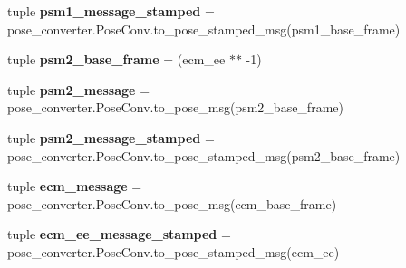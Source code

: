 \begin{DoxyCompactItemize}
\item 
\hypertarget{classmtm__alignment__test_1_1mtm__aligner_a5ab5797fdbfebd015d215d9dbcb2929e}{tuple {\bfseries psm1\-\_\-message\-\_\-stamped} = pose\-\_\-converter.\-Pose\-Conv.\-to\-\_\-pose\-\_\-stamped\-\_\-msg(psm1\-\_\-base\-\_\-frame)}\label{classmtm__alignment__test_1_1mtm__aligner_a5ab5797fdbfebd015d215d9dbcb2929e}

\item 
\hypertarget{classmtm__alignment__test_1_1mtm__aligner_a3575f94b228b6d8998bb4c19f8f4cde9}{tuple {\bfseries psm2\-\_\-base\-\_\-frame} = (ecm\-\_\-ee $\ast$$\ast$ -\/1)}\label{classmtm__alignment__test_1_1mtm__aligner_a3575f94b228b6d8998bb4c19f8f4cde9}

\item 
\hypertarget{classmtm__alignment__test_1_1mtm__aligner_a08c8a821a4f07982873341c23fe4a09d}{tuple {\bfseries psm2\-\_\-message} = pose\-\_\-converter.\-Pose\-Conv.\-to\-\_\-pose\-\_\-msg(psm2\-\_\-base\-\_\-frame)}\label{classmtm__alignment__test_1_1mtm__aligner_a08c8a821a4f07982873341c23fe4a09d}

\item 
\hypertarget{classmtm__alignment__test_1_1mtm__aligner_a8c0374e589d2db89fd59e01dbfaef02f}{tuple {\bfseries psm2\-\_\-message\-\_\-stamped} = pose\-\_\-converter.\-Pose\-Conv.\-to\-\_\-pose\-\_\-stamped\-\_\-msg(psm2\-\_\-base\-\_\-frame)}\label{classmtm__alignment__test_1_1mtm__aligner_a8c0374e589d2db89fd59e01dbfaef02f}

\item 
\hypertarget{classmtm__alignment__test_1_1mtm__aligner_affd419c85a6756e4646051d811ac38ba}{tuple {\bfseries ecm\-\_\-message} = pose\-\_\-converter.\-Pose\-Conv.\-to\-\_\-pose\-\_\-msg(ecm\-\_\-base\-\_\-frame)}\label{classmtm__alignment__test_1_1mtm__aligner_affd419c85a6756e4646051d811ac38ba}

\item 
\hypertarget{classmtm__alignment__test_1_1mtm__aligner_add6c43296672eb784ced99b9e224f58e}{tuple {\bfseries ecm\-\_\-ee\-\_\-message\-\_\-stamped} = pose\-\_\-converter.\-Pose\-Conv.\-to\-\_\-pose\-\_\-stamped\-\_\-msg(ecm\-\_\-ee)}\label{classmtm__alignment__test_1_1mtm__aligner_add6c43296672eb784ced99b9e224f58e}

\end{DoxyCompactItemize}


